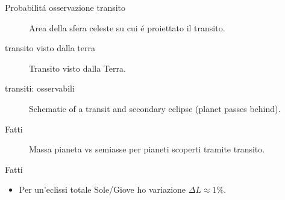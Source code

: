 \begin{wordonframe}{Probabilit\'a osservazione transito}
\begin{figure}[!ht]
\centering
\caption{Area della sfera celeste su cui \'e proiettato il transito.}
\end{figure}
\end{wordonframe}

\begin{wordonframe}{transito visto dalla terra}
\begin{figure}[!ht]
\centering
\caption{Transito visto dalla Terra.}
\end{figure}
\end{wordonframe}

\begin{wordonframe}{transiti: osservabili}
\begin{figure}[!ht]
\centering
\caption{Schematic of a transit and secondary eclipse (planet passes behind).}
\end{figure}
\end{wordonframe}

\begin{frame}{Fatti}
\begin{figure}[!ht]
\centering
\caption{Massa pianeta vs semiasse per pianeti scoperti tramite transito.}
\end{figure}
\end{frame}

\begin{wordonframe}{Fatti}
\begin{itemize}
    \item Per un'eclissi totale Sole/Giove ho variazione $\Delta L\approx1\%$.
\end{itemize}
\end{wordonframe}